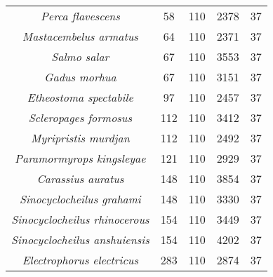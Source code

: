\begin{longtable}[c]{|c|c|c|c|c|}
\textit{Perca flavescens}              & 58  & 110 & 2378 & 37 \\
\textit{Mastacembelus armatus}         & 64  & 110 & 2371 & 37 \\
\textit{Salmo salar}                   & 67  & 110 & 3553 & 37 \\
\textit{Gadus morhua}                  & 67  & 110 & 3151 & 37 \\
\textit{Etheostoma spectabile}         & 97  & 110 & 2457 & 37 \\
\textit{Scleropages formosus}          & 112 & 110 & 3412 & 37 \\
\textit{Myripristis murdjan}           & 112 & 110 & 2492 & 37 \\
\textit{Paramormyrops kingsleyae}      & 121 & 110 & 2929 & 37 \\
\textit{Carassius auratus}             & 148 & 110 & 3854 & 37 \\
\textit{Sinocyclocheilus grahami}      & 148 & 110 & 3330 & 37 \\
\textit{Sinocyclocheilus rhinocerous}  & 154 & 110 & 3449 & 37 \\
\textit{Sinocyclocheilus anshuiensis}  & 154 & 110 & 4202 & 37 \\
\textit{Electrophorus electricus}      & 283 & 110 & 2874 & 37 \\ \hline
\end{longtable}